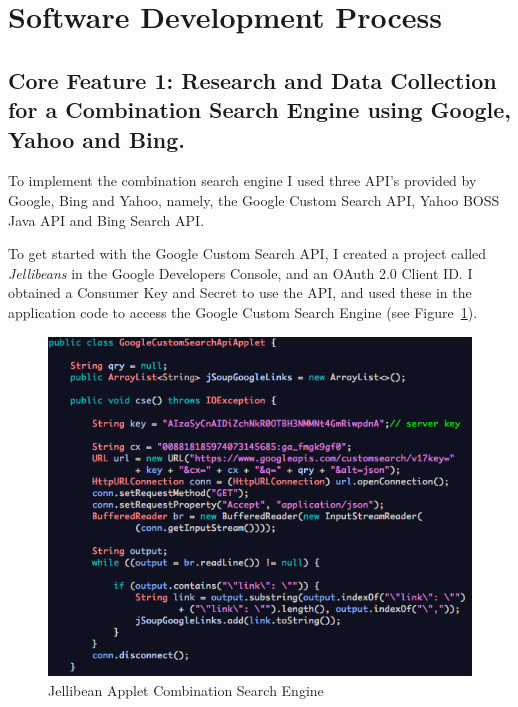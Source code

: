 \documentclass[a4paper, 11pt]{article}
\begin{document}

\section{Software Development Process}
\subsection{Core Feature 1: Research and Data Collection for a Combination Search Engine using Google, Yahoo and Bing.} 
To implement the combination search engine I used three API's provided by Google, Bing and Yahoo, namely, the Google Custom Search API, Yahoo BOSS Java API and Bing Search API. 

\vspace{5mm}
To get started with the Google Custom Search API, I created a project called \textit{Jellibeans} in the Google Developers Console, and an OAuth 2.0 Client ID. I obtained a Consumer Key and Secret to use the API, and used these in the application code to access the Google Custom Search Engine (see Figure~\ref{JBeanAppletGoogleCustomSearch1}). 

\begin{figure}[H]
\begin{center}
\includegraphics[scale=0.7]{JBeanAppletGoogleCustomSearch}
\end{center}

\caption{Jellibean Applet Combination Search Engine}
\label{JBeanAppletGoogleCustomSearch1}
\end{figure}
\end{document}

